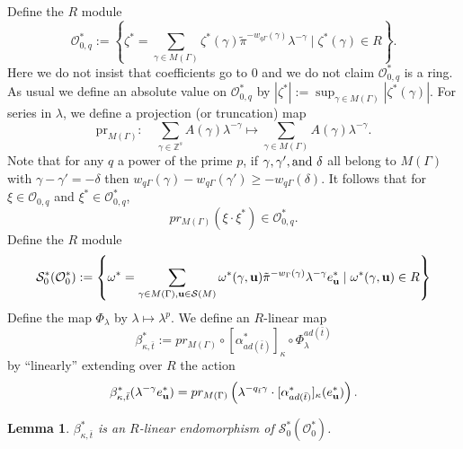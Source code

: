 \documentclass{article}
\newtheorem{lemma}[theorem]{Lemma}
\theoremstyle{remark}
\def\bb #1{ {\mathbb #1} }
\def\c #1{ {\mathcal #1} }
\def\b #1{ {\bf #1} }
\begin{document}
Define the $R$ module
\[
\c O_{0, q}^* := \left\{ \zeta^* = \sum_{\gamma \in M(\Gamma)} \zeta^*(\gamma) \tilde \pi^{- w_{q\Gamma}(\gamma)} \lambda^{-\gamma} \mid \zeta^*(\gamma) \in R \right\}.
\]
Here  we do not insist that coefficients go to $0$ and we do not claim $\c O_{0,q}^* $ is a ring. As usual we define an absolute value on $\c O_{0, q}^*$ by $|\zeta^*| := \sup_{\gamma \in M(\Gamma)} | \zeta^*(\gamma)|$. 
For series in $\lambda$, we define a projection (or truncation) map
\[
\text{pr}_{M(\Gamma)}: \quad
\sum_{\gamma \in \bb Z^s} A(\gamma) \lambda^{-\gamma} \longmapsto \sum_{\gamma \in M(\Gamma)} A(\gamma) \lambda^{-\gamma}.
\]
Note that for any $q$ a power of the prime $p$, if $\gamma, \gamma', \textup{and} \ \delta$ all belong to $M(\Gamma)$ with $\gamma - \gamma' = -\delta$ then ${w_{q \Gamma}(\gamma) - w_{q \Gamma}(\gamma') \geq -w_{q \Gamma}(\delta)}$. It follows that for $\xi \in \c O_{0, q}$ and $\xi^* \in \c O_{0, q}^*$,   
\begin{equation}\label{E: proj}
pr_{M(\Gamma)}( \xi \cdot \xi^*) \in \c O_{0, q}^*.
\end{equation}
Define the $R$ module
\[
\c S_0^*(\c O_0^*) :=  \left\{ \omega^* = \sum_{\gamma \in M(\Gamma), \b u \in \c S(M)} \omega^*(\gamma, \b u) \tilde \pi^{-w_\Gamma(\gamma)}\lambda^{-\gamma} e_{\b u}^* \mid \omega^*(\gamma, \b u) \in R  \right\}
\]
Define the map $\Phi_\lambda$ by $\lambda \mapsto \lambda^p$. We define an $R$-linear map
\[
\beta_{\kappa, \bar t}^* := pr_{M(\Gamma)} \circ [ \alpha_{a d(\bar t)}^* ]_\kappa \circ \Phi_\lambda^{a d(\bar t)}
\]
by ``linearly'' extending over $R$ the action
\[
\beta_{\kappa, \bar t}^*( \lambda^{-\gamma} e_{\b u}^*) = pr_{M(\Gamma)}\left( \lambda^{-q_{\bar t} \gamma} \cdot [ \alpha_{a d(\bar t)}^* ]_\kappa( e_{\b u}^*) \right).
\]

\begin{lemma}\label{L: beta is endo}
$\beta_{\kappa, \bar t}^*$ is an $R$-linear endomorphism of $\c S_0^*(\c O_0^*)$. 
\end{lemma}
\end{document}

